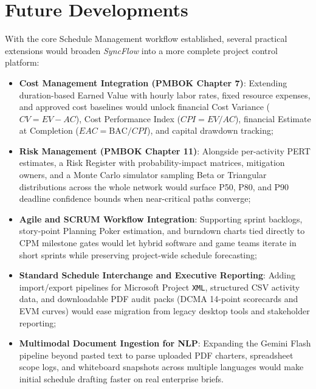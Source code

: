 \section{Future Developments}
With the core Schedule Management workflow established, several practical extensions would broaden \textit{SyncFlow} into a more complete project control platform:
\begin{itemize}[itemsep=2.5pt,topsep=2pt,parsep=0pt]
    \item \textbf{Cost Management Integration (PMBOK Chapter 7)}: Extending duration-based Earned Value with hourly labor rates, fixed resource expenses, and approved cost baselines would unlock financial Cost Variance ($CV = EV - AC$), Cost Performance Index ($CPI = EV / AC$), financial Estimate at Completion ($EAC = \text{BAC} / CPI$), and capital drawdown tracking;
    \item \textbf{Risk Management (PMBOK Chapter 11)}: Alongside per-activity PERT estimates, a Risk Register with probability-\allowbreak impact matrices, mitigation owners, and a Monte Carlo simulator sampling Beta or Triangular distributions across the whole network would surface P50, P80, and P90 deadline confidence bounds when near-critical paths converge;
    \item \textbf{Agile and SCRUM Workflow Integration}: Supporting sprint backlogs, story-point Planning Poker estimation, and burndown charts tied directly to CPM milestone gates would let hybrid software and game teams iterate in short sprints while preserving project-wide schedule forecasting;
    \item \textbf{Standard Schedule Interchange and Executive Reporting}: Adding import/export pipelines for Microsoft Project \texttt{XML}, structured CSV activity data, and downloadable PDF audit packs (DCMA 14-point scorecards and EVM curves) would ease migration from legacy desktop tools and stakeholder reporting;
    \item \textbf{Multimodal Document Ingestion for NLP}: Expanding the Gemini Flash pipeline beyond pasted text to parse uploaded PDF charters, spreadsheet scope logs, and whiteboard snapshots across multiple languages would make initial schedule drafting faster on real enterprise briefs.
\end{itemize}
